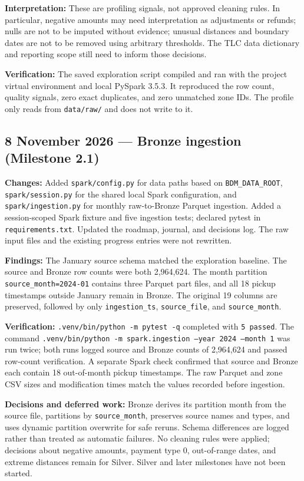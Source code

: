 \documentclass[11pt,a4paper]{article}
\begin{document}
\textbf{Interpretation:} These are profiling signals, not approved cleaning
rules. In particular, negative amounts may need interpretation as adjustments
or refunds; nulls are not to be imputed without evidence; unusual distances and
boundary dates are not to be removed using arbitrary thresholds. The TLC data
dictionary and reporting scope still need to inform those decisions.

\textbf{Verification:} The saved exploration script compiled and ran with the
project virtual environment and local PySpark 3.5.3. It reproduced the row
count, quality signals, zero exact duplicates, and zero unmatched zone IDs.
The profile only reads from \texttt{data/raw/} and does not write to it.

\subsection{8 November 2026 --- Bronze ingestion (Milestone 2.1)}
\textbf{Changes:} Added \texttt{spark/config.py} for data paths based on
\texttt{BDM\_DATA\_ROOT}, \texttt{spark/session.py} for the shared local Spark
configuration, and \texttt{spark/ingestion.py} for monthly raw-to-Bronze
Parquet ingestion. Added a session-scoped Spark fixture and five ingestion
tests; declared pytest in \texttt{requirements.txt}. Updated the roadmap,
journal, and decisions log. The raw input files and the existing progress
entries were not rewritten.

\textbf{Findings:} The January source schema matched the exploration baseline.
The source and Bronze row counts were both 2,964,624. The month partition
\texttt{source\_month=2024-01} contains three Parquet part files, and all 18
pickup timestamps outside January remain in Bronze. The original 19 columns
are preserved, followed by only \texttt{ingestion\_ts},
\texttt{source\_file}, and \texttt{source\_month}.

\textbf{Verification:} \texttt{.venv/bin/python -m pytest -q} completed with
\texttt{5 passed}. The command
\texttt{.venv/bin/python -m spark.ingestion --year 2024 --month 1} was run twice;
both runs logged source and Bronze counts of 2,964,624 and passed row-count
verification. A separate Spark check confirmed that source and Bronze each
contain 18 out-of-month pickup timestamps. The raw Parquet and zone CSV sizes
and modification times match the values recorded before ingestion.

\textbf{Decisions and deferred work:} Bronze derives its partition month from
the source file, partitions by \texttt{source\_month}, preserves source names
and types, and uses dynamic partition overwrite for safe reruns. Schema
differences are logged rather than treated as automatic failures. No cleaning
rules were applied; decisions about negative amounts, payment type 0,
out-of-range dates, and extreme distances remain for Silver. Silver and later
milestones have not been started.
\end{document}
